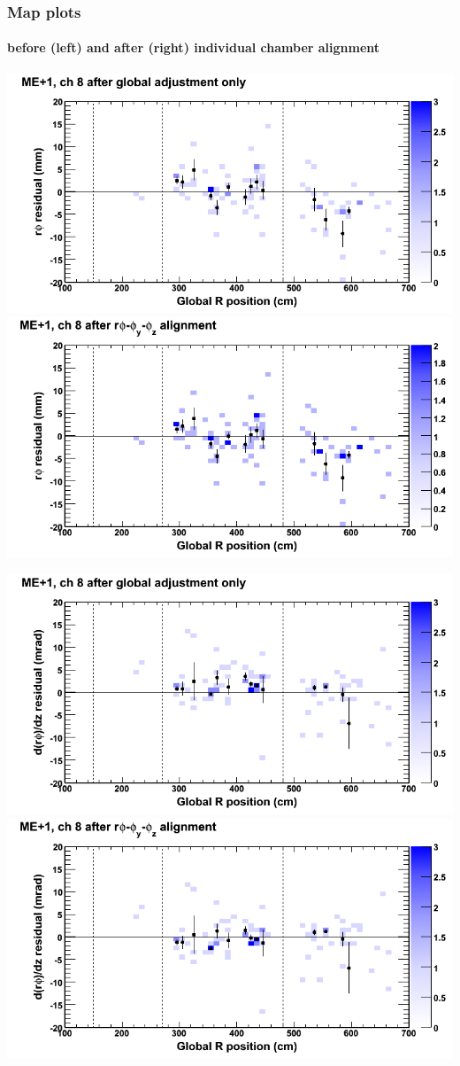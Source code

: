 \documentclass[compress]{beamer}
\begin{document}
\begin{frame}
\frametitle{Map plots}
\framesubtitle{before (left) and after (right) individual chamber alignment}
\includegraphics[width=0.5\linewidth]{ringmapplots_3dof/before_CSCvsr_mep1ch08_x.png} \includegraphics[width=0.5\linewidth]{ringmapplots_3dof/after_CSCvsr_mep1ch08_x.png}

\includegraphics[width=0.5\linewidth]{ringmapplots_3dof/before_CSCvsr_mep1ch08_dxdz.png} \includegraphics[width=0.5\linewidth]{ringmapplots_3dof/after_CSCvsr_mep1ch08_dxdz.png}
\end{frame}
\end{document}
